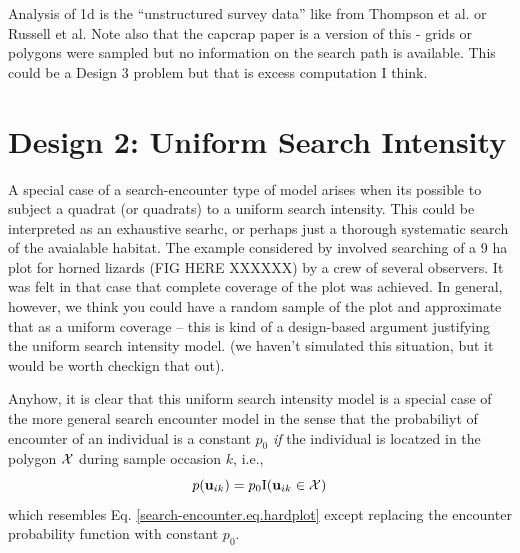 Analysis of 1d is the ``unstructured survey data'' like
from Thompson et al. or Russell et al.  Note also that the capcrap
paper is a version of this - grids or polygons were sampled but no
information on the search path is available. This could be a Design 3
problem but that is excess computation I think.








\section{Design 2: Uniform Search Intensity}

A special case of a search-encounter type of model arises when its
possible to subject a quadrat (or quadrats) to a uniform search
intensity. This could be interpreted as an exhaustive searhc, or
perhaps just a thorough systematic search of the avaialable habitat. 
The example considered by \citet{royle_young:2008} involved searching
of a 9 ha plot for horned lizards (FIG HERE XXXXXX) by a crew of
several observers. It was felt in that case that complete coverage of
the plot was achieved. In general, however, we think you could have
a random sample of the plot and approximate that as a uniform coverage
-- this is kind of a design-based argument justifying the uniform
search intensity model. (we haven't simulated this situation, but it
would be worth checkign that out).

Anyhow, it is clear that this uniform search intensity model is a
special case of the more general search encounter model in the sense
that the probabiliyt of encounter of an individual is a constant
$p_{0}$ {\it if} the individual is locatzed in the polygon ${\cal X}$
during sample occasion $k$,  i.e., 
\[
p({\bf u}_{ik}) = p_{0} \mbox{I}({\bf u}_{ik} \in {\cal X})
\]
which resembles Eq. \ref{search-encounter.eq.hardplot}
except replacing the encounter
probability function with constant $p_{0}$. 

